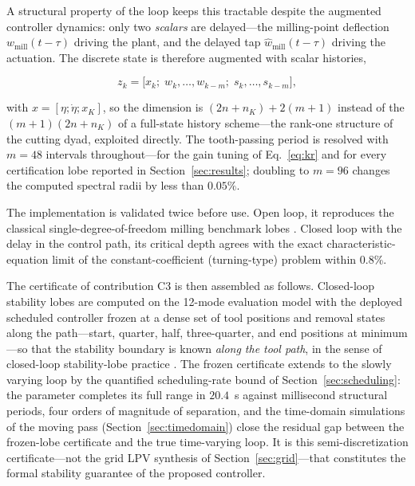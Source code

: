 \documentclass[preprint,12pt]{elsarticle}
\newcommand{\wmill}{w_{\mathrm{mill}}}
\newcommand{\whmill}{\hat{w}_{\mathrm{mill}}}
\begin{document}
A structural property of the loop keeps this tractable despite the
augmented controller dynamics: only two \emph{scalars} are delayed---the
milling-point deflection $\wmill(t - \tau)$ driving the plant, and the
delayed tap $\whmill(t - \tau)$ driving the actuation. The discrete
state is therefore augmented with scalar histories,

\begin{equation}
\label{eq:sdmstate}
z_k = \bigl[ x_k;\; w_k, \ldots, w_{k-m};\; s_k, \ldots, s_{k-m}
\bigr],
\end{equation}

with $x = [\eta; \dot{\eta}; x_K]$, so the dimension is
$(2 n + n_K) + 2 (m + 1)$ instead of the $(m + 1)(2 n + n_K)$ of a
full-state history scheme---the rank-one structure of the cutting
dyad, exploited directly. The tooth-passing period is resolved with
$m = 48$ intervals throughout---for the gain tuning of
Eq.~\eqref{eq:kr} and for every certification lobe reported in
Section~\ref{sec:results}; doubling to $m = 96$ changes the computed
spectral radii by less than $0.05\%$.

The implementation is validated twice before use. Open loop, it
reproduces the classical single-degree-of-freedom milling benchmark
lobes \cite{insperger2004updated,altintas1995analytical}. Closed loop
with the delay in the control path, its critical depth agrees with the
exact characteristic-equation limit of the constant-coefficient
(turning-type) problem within 0.8\%.

The certificate of contribution C3 is then assembled as follows.
Closed-loop stability lobes are computed on the 12-mode evaluation model
with the deployed scheduled controller frozen at a dense set of tool
positions and removal states along the path---start, quarter, half,
three-quarter, and end positions at minimum---so that the stability
boundary is known \emph{along the tool path}, in the sense of
closed-loop stability-lobe practice
\cite{zhang2019discrete,lehotzky2021milling,monnin2014modeling}. The
frozen certificate extends to the slowly varying loop by the quantified
scheduling-rate bound of Section~\ref{sec:scheduling}: the parameter
completes its full range in $20.4$~s against millisecond structural
periods, four orders of magnitude of separation, and the time-domain
simulations of the moving pass (Section~\ref{sec:timedomain}) close the
residual gap between the frozen-lobe certificate and the true
time-varying loop. It is this semi-discretization certificate---not the
grid LPV synthesis of Section~\ref{sec:grid}---that constitutes the
formal stability guarantee of the proposed controller.
\end{document}
